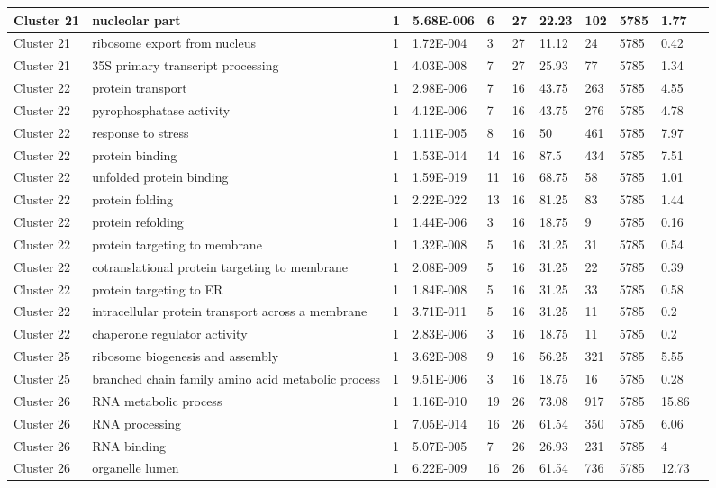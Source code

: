 \begin{tabular}{|l|l|l|l|l|l|l|l|l|l|l|}
\hline
Cluster 21&nucleolar part&1&5.68E-006&6&27&22.23&102&5785&1.77&\\
\hline
Cluster 21&ribosome export from nucleus&1&1.72E-004&3&27&11.12&24&5785&0.42&\\
\hline
Cluster 21&35S primary transcript processing&1&4.03E-008&7&27&25.93&77&5785&1.34&\\
\hline
Cluster 22&protein transport&1&2.98E-006&7&16&43.75&263&5785&4.55&\\
\hline
Cluster 22&pyrophosphatase activity&1&4.12E-006&7&16&43.75&276&5785&4.78&\\
\hline
Cluster 22&response to stress&1&1.11E-005&8&16&50&461&5785&7.97&\\
\hline
Cluster 22&protein binding&1&1.53E-014&14&16&87.5&434&5785&7.51&\\
\hline
Cluster 22&unfolded protein binding&1&1.59E-019&11&16&68.75&58&5785&1.01&\\
\hline
Cluster 22&protein folding&1&2.22E-022&13&16&81.25&83&5785&1.44&\\
\hline
Cluster 22&protein refolding&1&1.44E-006&3&16&18.75&9&5785&0.16&\\
\hline
Cluster 22&protein targeting to membrane&1&1.32E-008&5&16&31.25&31&5785&0.54&\\
\hline
Cluster 22&cotranslational protein targeting to membrane&1&2.08E-009&5&16&31.25&22&5785&0.39&\\
\hline
Cluster 22&protein targeting to ER&1&1.84E-008&5&16&31.25&33&5785&0.58&\\
\hline
Cluster 22&intracellular protein transport across a membrane&1&3.71E-011&5&16&31.25&11&5785&0.2&\\
\hline
Cluster 22&chaperone regulator activity&1&2.83E-006&3&16&18.75&11&5785&0.2&\\
\hline
Cluster 25&ribosome biogenesis and assembly&1&3.62E-008&9&16&56.25&321&5785&5.55&\\
\hline
Cluster 25&branched chain family amino acid metabolic process&1&9.51E-006&3&16&18.75&16&5785&0.28&\\
\hline
Cluster 26&RNA metabolic process&1&1.16E-010&19&26&73.08&917&5785&15.86&\\
\hline
Cluster 26&RNA processing&1&7.05E-014&16&26&61.54&350&5785&6.06&\\
\hline
Cluster 26&RNA binding&1&5.07E-005&7&26&26.93&231&5785&4&\\
\hline
Cluster 26&organelle lumen&1&6.22E-009&16&26&61.54&736&5785&12.73&\\

\end{tabular}
